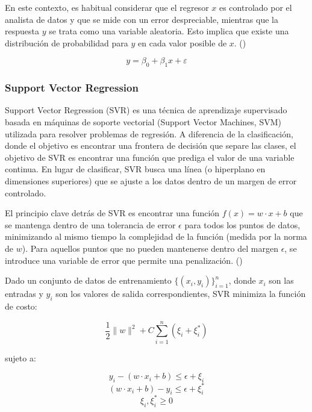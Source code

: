 En este contexto, es habitual considerar que el regresor \( x \) es controlado por el analista de datos y que se mide con un error despreciable, mientras que la respuesta \( y \) se trata como una variable aleatoria. Esto implica que existe una distribución de probabilidad para \( y \) en cada valor posible de \( x \). (\cite{montgomery2013introduction})


\begin{equation}  
	\label{eq:linealr}
	y = \beta_0 + \beta_1 x + \varepsilon
\end{equation}

\subsubsection{Support Vector Regression}

Support Vector Regression (SVR) es una técnica de aprendizaje supervisado basada en máquinas de soporte vectorial (Support Vector Machines, SVM) utilizada para resolver problemas de regresión. A diferencia de la clasificación, donde el objetivo es encontrar una frontera de decisión que separe las clases, el objetivo de SVR es encontrar una función que prediga el valor de una variable continua. En lugar de clasificar, SVR busca una línea (o hiperplano en dimensiones superiores) que se ajuste a los datos dentro de un margen de error controlado.

El principio clave detrás de SVR es encontrar una función \( f(x) = w \cdot x + b \) que se mantenga dentro de una tolerancia de error \(\epsilon\) para todos los puntos de datos, minimizando al mismo tiempo la complejidad de la función (medida por la norma de \(w\)). Para aquellos puntos que no pueden mantenerse dentro del margen \(\epsilon\), se introduce una variable de error que permite una penalización. (\cite{wang2005support})

Dado un conjunto de datos de entrenamiento \(\{(x_i, y_i)\}_{i=1}^n\), donde \(x_i\) son las entradas y \(y_i\) son los valores de salida correspondientes, SVR minimiza la función de costo:

\begin{equation} 
	\label{eq:}
\frac{1}{2} \| w \|^2 + C \sum_{i=1}^n (\xi_i + \xi_i^*)
\end{equation}

sujeto a:

\begin{equation}  
	\label{eq:}
	y_i - (w \cdot x_i + b) \leq \epsilon + \xi_i
\end{equation}
\begin{equation} 
(w \cdot x_i + b) - y_i \leq \epsilon + \xi_i^*
\end{equation}
\begin{equation}
\xi_i, \xi_i^* \geq 0
\end{equation}

